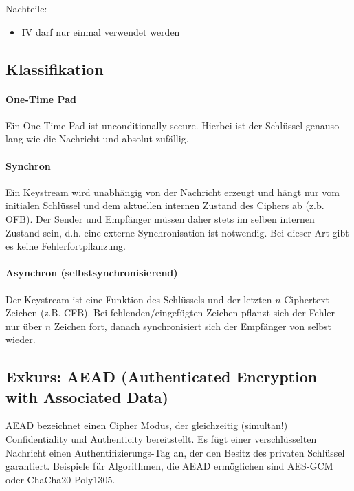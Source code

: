 Nachteile: 
\begin{itemize}
    \item IV darf nur einmal verwendet werden
\end{itemize}

\subsection{Klassifikation}

\paragraph{One-Time Pad}

Ein One-Time Pad ist unconditionally secure. Hierbei ist der Schlüssel genauso lang wie die Nachricht und absolut zufällig.

\paragraph{Synchron}

Ein Keystream wird unabhängig von der Nachricht erzeugt und hängt nur vom initialen Schlüssel und dem 
aktuellen internen Zustand des Ciphers ab (z.b. OFB).
Der Sender und Empfänger müssen daher stets im selben internen Zustand sein, d.h. eine externe Synchronisation ist notwendig.
Bei dieser Art gibt es keine Fehlerfortpflanzung.

\paragraph{Asynchron (selbstsynchronisierend)}

Der Keystream ist eine Funktion des Schlüssels und der letzten $n$ Ciphertext Zeichen (z.B. CFB).
Bei fehlenden/eingefügten Zeichen pflanzt sich der Fehler nur über $n$ Zeichen fort,
danach synchronisiert sich der Empfänger von selbst wieder.

\subsection{Exkurs: AEAD (Authenticated Encryption with Associated Data)} 

AEAD bezeichnet einen Cipher Modus, der gleichzeitig (simultan!) Confidentiality und Authenticity bereitstellt. Es fügt einer verschlüsselten Nachricht einen 
Authentifizierungs-Tag an, der den Besitz des privaten Schlüssel garantiert. Beispiele für Algorithmen, die AEAD ermöglichen sind AES-GCM oder ChaCha20-Poly1305. \\

